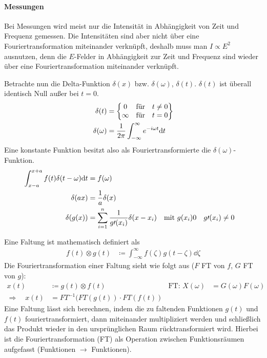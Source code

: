 \paragraph{Messungen} Bei Messungen wird meist nur die Intensität in
Abhängigkeit von Zeit und Frequenz gemessen. Die Intensitäten sind
aber nicht über eine Fouriertransformation miteinander verknüpft,
deshalb muss man $I\propto E^2$ ausnutzen, denn die $E$-Felder in
Abhängigkeit zur Zeit und Frequenz sind wieder über eine
Fouriertransformation miteinander verknüpft.

Betrachte nun die Delta-Funktion $\delta(x)$ bzw. $\delta(\omega)$,
$\delta(t)$. $\delta(t)$ ist überall identisch Null außer bei $t=0$. 
\begin{align*}
  \delta(t) &= \begin{Bmatrix}
    0 &\text{für} &t\neq 0\\
    \infty &\text{für} &t=0
  \end{Bmatrix}\\
  \delta(\omega) &= \frac{1}{2\pi}\int_{-\infty}^{\infty}
                   e^{-i\omega t}\mathrm{d} t
\end{align*}
Eine konstante Funktion besitzt also als Fouriertransformierte die
$\delta(\omega)$-Funktion.
\begin{align*}
  \int_{x-a}^{x+a} f(t)\delta(t-\omega)\mathrm{d} t
  &= f(\omega)\\
  \delta(ax) &= \frac{1}{a}\delta(x)\\
  \delta(g(x)) &= \sum_{i=1}^{n}\frac{1}{g\prime (x_i)}\delta(x-x_i)
             &\text{mit } g(x_i)&0&g\prime(x_i)&\neq 0
\end{align*}

Eine Faltung ist mathematisch definiert als 
\begin{align*}
  f(t)\otimes g(t)
  &\coloneqq \int_{-\infty}^{\infty} f(\zeta)g(t-\zeta)\dd\zeta
\end{align*}
Die Fouriertransformation einer Faltung sieht wie folgt aus ($F$ FT
von $f$, $G$ FT von $g$):
\begin{align*}
  x(t) &\coloneqq g(t)\otimes f(t)
  &\text{FT: } X(\omega) &= G(\omega)F(\omega)\\
  \Rightarrow\quad 
  x(t) &= FT^{-1}(FT(g(t))\cdot FT(f(t))
\end{align*}
Eine Faltung lässt sich berechnen, indem die zu faltenden Funktionen
$g(t)$ und $f(t)$ fouriertransformiert, dann miteinander
multipliziert werden und schließlich das Produkt wieder in den
ursprünglichen Raum rücktransformiert wird.
Hierbei ist die Fouriertransformation (FT) als Operation zwischen
Funktionsräumen aufgefasst (Funktionen $\to$ Funktionen).

